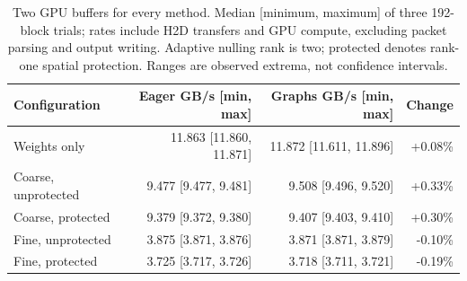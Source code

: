 \begin{table}
\centering
\small
\caption{Two GPU buffers for every method. Median [minimum, maximum] of three 192-block trials; rates include H2D transfers and GPU compute, excluding packet parsing and output writing. Adaptive nulling rank is two; protected denotes rank-one spatial protection. Ranges are observed extrema, not confidence intervals.}
\label{tab:beam-two-buffers}
\begin{tabular}{lrrr}
\toprule
Configuration & Eager GB/s [min, max] & Graphs GB/s [min, max] & Change \\
\midrule
Weights only & 11.863 [11.860, 11.871] & 11.872 [11.611, 11.896] & +0.08\% \\
Coarse, unprotected & 9.477 [9.477, 9.481] & 9.508 [9.496, 9.520] & +0.33\% \\
Coarse, protected & 9.379 [9.372, 9.380] & 9.407 [9.403, 9.410] & +0.30\% \\
Fine, unprotected & 3.875 [3.871, 3.876] & 3.871 [3.871, 3.879] & -0.10\% \\
Fine, protected & 3.725 [3.717, 3.726] & 3.718 [3.711, 3.721] & -0.19\% \\
\bottomrule
\end{tabular}
\end{table}
